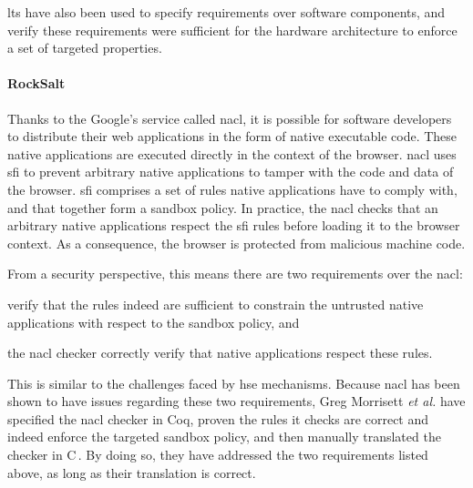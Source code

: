 \ac{lts} have also been used to specify requirements over software components,
and verify these requirements were sufficient for the hardware architecture to
enforce a set of targeted properties.

\paragraph{RockSalt}
%
Thanks to the Google's service called \ac{nacl}, it is possible for software
developers to distribute their web applications in the form of native executable
code.
%
These native applications are executed directly in the context of the browser.
%
\ac{nacl} uses \ac{sfi} to prevent arbitrary native applications to tamper with
the code and data of the browser.
%
\ac{sfi} comprises a set of rules native applications have to comply with, and
that together form a sandbox policy.
%
In practice, the \ac{nacl} checks that an arbitrary native applications respect
the \ac{sfi} rules before loading it to the browser context.
%
As a consequence, the browser is protected from malicious machine code.

From a security perspective, this means there are two requirements over the
\ac{nacl}:
%
\begin{inparaenum}[(1)]
\item verify that the rules indeed are sufficient to constrain the untrusted
  native applications with respect to the sandbox policy, and
%
\item the \ac{nacl} checker correctly verify that native applications respect
  these rules.
\end{inparaenum}
%
This is similar to the challenges faced by \ac{hse} mechanisms.
%
Because \ac{nacl} has been shown to have issues regarding these two
requirements, Greg Morrisett \emph{et al.} have specified the \ac{nacl} checker
in Coq, proven the rules it checks are correct and indeed enforce the targeted
sandbox policy, and then manually translated the checker in
C\,\cite{morrisett2012rocksalt}.
%
By doing so, they have addressed the two requirements listed above, as long as
their translation is correct.

